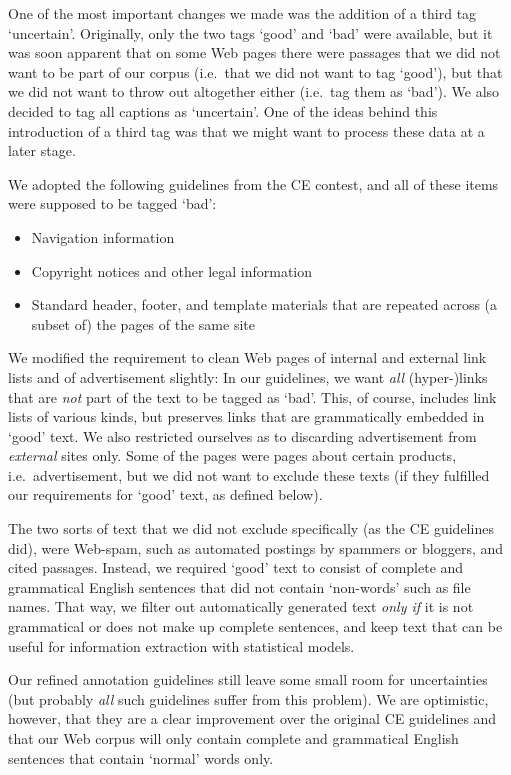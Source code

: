 \documentclass[12pt]{article}
\begin{document}
One of the most important changes we made was the addition of a third tag `uncertain'. 
Originally, only the two tags `good' and `bad' were available, but it was soon apparent that on some Web pages there were passages that we did not want to be part of our corpus (i.e.~that we did not want to tag `good'), but that we did not want to throw out altogether either (i.e.~tag them as `bad'). 
We also decided to tag all captions as `uncertain'. 
One of the ideas behind this introduction of a third tag was that we might want to process these data at a later stage.

We adopted the following guidelines from the CE contest, and all of these items were supposed to be tagged `bad':

\begin{itemize}
	\item Navigation information
	\item Copyright notices and other legal information
	\item Standard header, footer, and template materials that are repeated across (a subset of) the pages of the same site
\end{itemize}

We modified the requirement to clean Web pages of internal and external link lists and of advertisement slightly: 
In our guidelines, we want \textit{all} \mbox{(hyper-)links} that are \textit{not} part of the text to be tagged as `bad'. 
This, of course, includes link lists of various kinds, but preserves links that are grammatically embedded in `good' text. 
We also restricted ourselves as to discarding advertisement from \textit{external} sites only. 
Some of the pages were pages about certain products, i.e.~advertisement, but we did not want to exclude these texts (if they fulfilled our requirements for `good' text, as defined below).

The two sorts of text that we did not exclude specifically (as the CE guidelines did), were Web-spam, such as automated postings by spammers or bloggers, and cited passages. 
Instead, we required `good' text to consist of complete and grammatical English sentences that did not contain `non-words' such as file names. 
That way, we filter out automatically generated text \textit{only if} it is not grammatical or does not make up complete sentences, and keep text that can be useful for information extraction with statistical models.

Our refined annotation guidelines still leave some small room for uncertainties (but probably \textit{all} such guidelines suffer from this problem). 
We are optimistic, however, that they are a clear improvement over the original CE guidelines and that our Web corpus will only contain complete and grammatical English sentences that contain `normal' words only.
\end{document}
